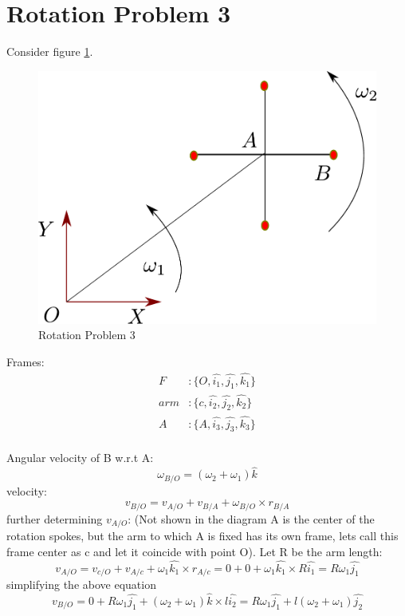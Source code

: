 \section{Rotation Problem 3}

Consider figure \ref{Fig_RotationProblem3}.
\newpage
\begin{figure}[h!]
	\centering
	\includegraphics[width=0.65\linewidth]{Bilder/08_RotationProblem3.pdf}
	\caption{Rotation Problem 3}
	\label{Fig_RotationProblem3}
\end{figure}

Frames:
\begin{align*}
	F &: \{ O, \hat{i_{1}}, \hat{j_{1}}, \hat{k_{1}} \} \\
	arm &: \{ c, \hat{i_{2}}, \hat{j_{2}}, \hat{k_{2}} \} \\
	A &: \{ A, \hat{i_{3}}, \hat{j_{3}}, \hat{k_{3}} \} \\
\end{align*}

Angular velocity of B w.r.t A:
\begin{equation}
	\omega_{B/O} = (\omega_{2} + \omega_{1}) \hat{k}
\end{equation}
velocity:
\begin{equation}
	v_{B/O} = v_{A/O} + v_{B/A} + \omega_{B/O} \times r_{B/A}
\end{equation}
further determining $v_{A/O}$: (Not shown in the diagram A is the center of the rotation spokes, but the arm to which A is fixed has its own frame, lets call this frame center as c and let it coincide with point O). Let R be the arm length:
\begin{equation}
	v_{A/O} = v_{c/O} + v_{A/c} + \omega_{1}\hat{k_{1}} \times r_{A/c} = 0 + 0 + \omega_{1}\hat{k_{1}} \times R \hat{i_{1}} = R \omega_{1} \hat{j_{1}}
\end{equation}
simplifying the above equation
\begin{equation}
	v_{B/O} = 0 + R \omega_{1} \hat{j_{1}} + (\omega_{2} + \omega_{1}) \hat{k} \times l \hat{i_{2}} = R \omega_{1} \hat{j_{1}} + l (\omega_{2} + \omega_{1}) \hat{j_{2}}
\end{equation}

